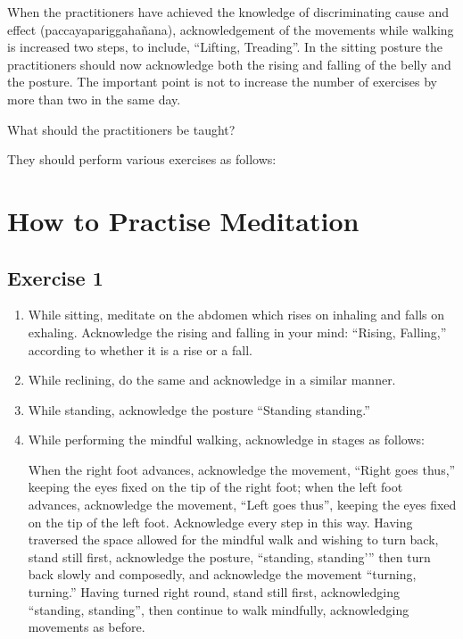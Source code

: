 \documentclass[a5paper,10pt,english]{book}
\begin{document}
\sphinxAtStartPar
When the practitioners have achieved the knowledge of discriminating cause and effect (paccayapariggahañana), acknowledgement of the movements while walking is increased two steps, to include, “Lifting, Treading”. In the sitting posture the practitioners should now acknowledge both the rising and falling of the belly and the posture. The important point is not to increase the number of exercises by more than two in the same day.

\sphinxAtStartPar
{} What should the practitioners be taught?

\sphinxAtStartPar
{} They should perform various exercises as follows:

\sphinxstepscope


\chapter{How to Practise Meditation}
\label{\detokenize{practice:how-to-practise-meditation}}\label{\detokenize{practice::doc}}

\section{Exercise 1}
\label{\detokenize{practice:exercise-1}}\begin{enumerate}
%
\item {} 
\sphinxAtStartPar
While sitting, meditate on the abdomen which rises on inhaling and falls on exhaling. Acknowledge the rising and falling in your mind: “Rising, Falling,” according to whether it is a rise or a fall.

\item {} 
\sphinxAtStartPar
While reclining, do the same and acknowledge in a similar manner.

\item {} 
\sphinxAtStartPar
While standing, acknowledge the posture “Standing standing.”

\item {} 
\sphinxAtStartPar
While performing the mindful walking, acknowledge in stages as follows:

\sphinxAtStartPar
When the right foot advances, acknowledge the movement, “Right goes thus,” keeping the eyes fixed on the tip of the right foot; when the left foot advances, acknowledge the movement, “Left goes thus”, keeping the eyes fixed on the tip of the left foot. Acknowledge every step in this way. Having traversed the space allowed for the mindful walk and wishing to turn back, stand still first, acknowledge the posture, “standing, standing’” then turn back slowly and composedly, and acknowledge the movement “turning, turning.” Having turned right round, stand still first, acknowledging “standing, standing”, then continue to walk mindfully, acknowledging movements as before.

\end{enumerate}
\end{document}
